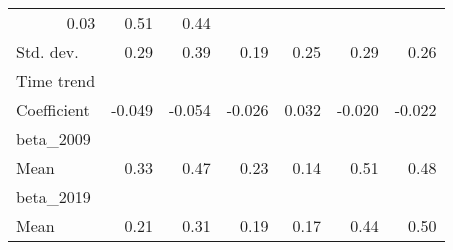 \begin{tabular}{lllllll}
  \multicolumn{1}{r}{0.03} &
  \multicolumn{1}{r}{0.51} &
  \multicolumn{1}{r}{0.44} \\
\multicolumn{1}{l}{\hspace{1em}Std. dev.} &
  \multicolumn{1}{|r}{0.29} &
  \multicolumn{1}{r}{0.39} &
  \multicolumn{1}{r}{0.19} &
  \multicolumn{1}{r}{0.25} &
  \multicolumn{1}{r}{0.29} &
  \multicolumn{1}{r}{0.26} \\
\multicolumn{1}{l}{Time trend} &
  \multicolumn{1}{|r}{} &
  \multicolumn{1}{r}{} &
  \multicolumn{1}{r}{} &
  \multicolumn{1}{r}{} &
  \multicolumn{1}{r}{} &
  \multicolumn{1}{r}{} \\
\multicolumn{1}{l}{\hspace{1em}Coefficient} &
  \multicolumn{1}{|r}{-0.049} &
  \multicolumn{1}{r}{-0.054} &
  \multicolumn{1}{r}{-0.026} &
  \multicolumn{1}{r}{0.032} &
  \multicolumn{1}{r}{-0.020} &
  \multicolumn{1}{r}{-0.022} \\
\multicolumn{1}{l}{beta\_2009} &
  \multicolumn{1}{|r}{} &
  \multicolumn{1}{r}{} &
  \multicolumn{1}{r}{} &
  \multicolumn{1}{r}{} &
  \multicolumn{1}{r}{} &
  \multicolumn{1}{r}{} \\
\multicolumn{1}{l}{\hspace{1em}Mean} &
  \multicolumn{1}{|r}{0.33} &
  \multicolumn{1}{r}{0.47} &
  \multicolumn{1}{r}{0.23} &
  \multicolumn{1}{r}{0.14} &
  \multicolumn{1}{r}{0.51} &
  \multicolumn{1}{r}{0.48} \\
\multicolumn{1}{l}{beta\_2019} &
  \multicolumn{1}{|r}{} &
  \multicolumn{1}{r}{} &
  \multicolumn{1}{r}{} &
  \multicolumn{1}{r}{} &
  \multicolumn{1}{r}{} &
  \multicolumn{1}{r}{} \\
\multicolumn{1}{l}{\hspace{1em}Mean} &
  \multicolumn{1}{|r}{0.21} &
  \multicolumn{1}{r}{0.31} &
  \multicolumn{1}{r}{0.19} &
  \multicolumn{1}{r}{0.17} &
  \multicolumn{1}{r}{0.44} &
  \multicolumn{1}{r}{0.50} \\
\cline{1-7}
\end{tabular}
